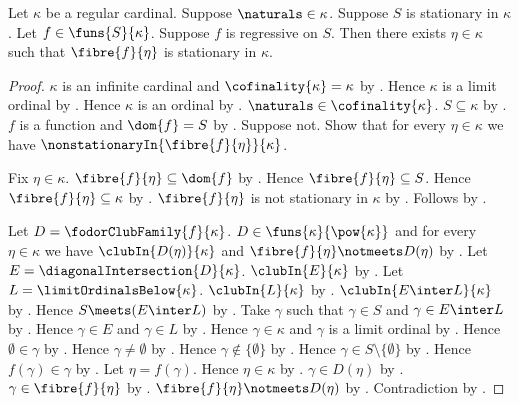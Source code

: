\begin{theorem}\label{fodor}
    Let $\kappa$ be a regular cardinal.
    Suppose $\naturals\in\kappa$.
    Suppose $S$ is stationary in $\kappa$.
    Let $f\in\funs{S}{\kappa}$.
    Suppose $f$ is regressive on $S$.
    Then there exists $\eta\in\kappa$ such that
        $\fibre{f}{\eta}$ is stationary in $\kappa$.
\end{theorem}
\begin{proof}
    $\kappa$ is an infinite cardinal and
        $\cofinality{\kappa}=\kappa$ by .
    Hence $\kappa$ is a limit ordinal
        by .
    Hence $\kappa$ is an ordinal by .
    $\naturals\in\cofinality{\kappa}$.
    $S\subseteq\kappa$ by .
    $f$ is a function and $\dom{f}=S$
        by .
    Suppose not.
    Show that for every $\eta\in\kappa$ we have
        $\nonstationaryIn{\fibre{f}{\eta}}{\kappa}$.
    \begin{subproof}
        Fix $\eta\in\kappa$.
        $\fibre{f}{\eta}\subseteq\dom{f}$
            by .
        Hence $\fibre{f}{\eta}\subseteq S$.
        Hence $\fibre{f}{\eta}\subseteq\kappa$
            by .
        $\fibre{f}{\eta}$ is not stationary in $\kappa$ by \auto.
        Follows by .
    \end{subproof}
    Let $D=\fodorClubFamily{f}{\kappa}$.
    $D\in\funs{\kappa}{\pow{\kappa}}$ and
        for every $\eta\in\kappa$ we have
            $\clubIn{D(\eta)}{\kappa}$ and
            $\fibre{f}{\eta}\notmeets D(\eta)$
        by .
    Let $E=\diagonalIntersection{D}{\kappa}$.
    $\clubIn{E}{\kappa}$
        by .
    Let $L=\limitOrdinalsBelow{\kappa}$.
    $\clubIn{L}{\kappa}$ by .
    $\clubIn{E\inter L}{\kappa}$
        by .
    Hence $S\meets(E\inter L)$ by .
    Take $\gamma$ such that $\gamma\in S$ and
        $\gamma\in E\inter L$ by .
    Hence $\gamma\in E$ and $\gamma\in L$
        by .
    Hence $\gamma\in\kappa$ and $\gamma$ is a limit ordinal
        by .
    Hence $\emptyset\in\gamma$ by .
    Hence $\gamma\neq\emptyset$ by .
    Hence $\gamma\notin\{\emptyset\}$ by .
    Hence $\gamma\in S\setminus\{\emptyset\}$
        by .
    Hence $f(\gamma)\in\gamma$ by .
    Let $\eta=f(\gamma)$.
    Hence $\eta\in\kappa$ by .
    $\gamma\in D(\eta)$ by .
    $\gamma\in\fibre{f}{\eta}$
        by .
    $\fibre{f}{\eta}\notmeets D(\eta)$
        by .
    Contradiction by .
\end{proof}

